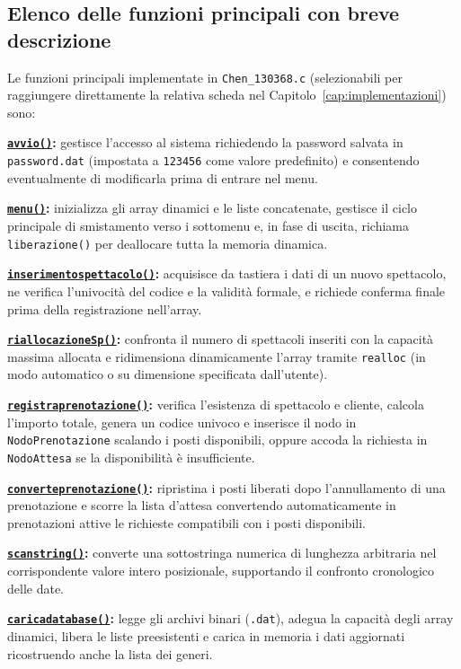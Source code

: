 \documentclass[11pt,a4paper,oneside,openany]{book}
\newenvironment{listacomp}{%
    \small
    \begin{list}{\textendash}{%
        \setlength{\topsep}{2pt}%
        \setlength{\partopsep}{0pt}%
        \setlength{\itemsep}{1pt}%
        \setlength{\parsep}{0pt}%
        \setlength{\leftmargin}{1.2em}%
    }%
}{%
    \end{list}%
}
\begin{document}
\subsection{Elenco delle funzioni principali con breve descrizione}
Le funzioni principali implementate in \texttt{Chen\_130368.c} (selezionabili per raggiungere direttamente la relativa scheda nel Capitolo~\ref{cap:implementazioni}) sono:
\begin{listacomp}
    \item \textbf{\hyperref[sec:avvio]{\texttt{avvio()}}:} gestisce l'accesso al sistema richiedendo la password salvata in \texttt{password.dat} (impostata a \texttt{123456} come valore predefinito) e consentendo eventualmente di modificarla prima di entrare nel menu.
    \item \textbf{\hyperref[sec:menu]{\texttt{menu()}}:} inizializza gli array dinamici e le liste concatenate, gestisce il ciclo principale di smistamento verso i sottomenu e, in fase di uscita, richiama \texttt{liberazione()} per deallocare tutta la memoria dinamica.
    \item \textbf{\hyperref[sec:inserimentospettacolo]{\texttt{inserimentospettacolo()}}:} acquisisce da tastiera i dati di un nuovo spettacolo, ne verifica l'univocità del codice e la validità formale, e richiede conferma finale prima della registrazione nell'array.
    \item \textbf{\hyperref[sec:riallocazioneSp]{\texttt{riallocazioneSp()}}:} confronta il numero di spettacoli inseriti con la capacità massima allocata e ridimensiona dinamicamente l'array tramite \texttt{realloc} (in modo automatico o su dimensione specificata dall'utente).
    \item \textbf{\hyperref[sec:registraprenotazione]{\texttt{registraprenotazione()}}:} verifica l'esistenza di spettacolo e cliente, calcola l'importo totale, genera un codice univoco e inserisce il nodo in \texttt{NodoPrenotazione} scalando i posti disponibili, oppure accoda la richiesta in \texttt{NodoAttesa} se la disponibilità è insufficiente.
    \item \textbf{\hyperref[sec:converteprenotazione]{\texttt{converteprenotazione()}}:} ripristina i posti liberati dopo l'annullamento di una prenotazione e scorre la lista d'attesa convertendo automaticamente in prenotazioni attive le richieste compatibili con i posti disponibili.
    \item \textbf{\hyperref[sec:scanstring]{\texttt{scanstring()}}:} converte una sottostringa numerica di lunghezza arbitraria nel corrispondente valore intero posizionale, supportando il confronto cronologico delle date.
    \item \textbf{\hyperref[sec:caricadatabase]{\texttt{caricadatabase()}}:} legge gli archivi binari (\texttt{.dat}), adegua la capacità degli array dinamici, libera le liste preesistenti e carica in memoria i dati aggiornati ricostruendo anche la lista dei generi.
\end{listacomp}
\end{document}
